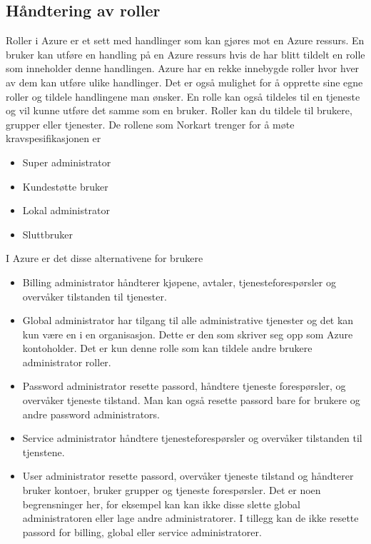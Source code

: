 \subsection{Håndtering av roller}
\label{subsec::konfigurasjon_handteringAvRollerOgGrupper_roller}
Roller i Azure er et sett med handlinger som kan gjøres mot en Azure ressurs. En bruker kan utføre en handling på en Azure ressurs hvis de har blitt tildelt en rolle som inneholder denne handlingen. Azure har en rekke innebygde roller hvor hver av dem kan utføre ulike handlinger. Det er også mulighet for å opprette sine egne roller og tildele handlingene man ønsker. En rolle kan også tildeles til en tjeneste og vil kunne utføre det samme som en bruker. Roller kan du tildele til brukere, grupper eller tjenester. De rollene som Norkart trenger for å møte kravspesifikasjonen er \\
\begin{itemize}
\item Super administrator
\item Kundestøtte bruker
\item Lokal administrator
\item Sluttbruker
\end{itemize}
I Azure er det disse alternativene for brukere
\begin{itemize}
\item Billing administrator håndterer kjøpene, avtaler, tjenesteforespørsler  og overvåker tilstanden til tjenester.
\item Global administrator har tilgang til alle administrative tjenester og det kan kun være en i en organisasjon. Dette er den som skriver seg opp som Azure kontoholder. Det er kun denne rolle som kan tildele andre brukere administrator roller.
\item Password administrator resette passord, håndtere tjeneste forespørsler, og overvåker tjeneste tilstand. Man kan også resette passord bare for brukere og andre password administrators.
\item Service administrator håndtere tjenesteforespørsler og overvåker tilstanden til tjenstene.
\item User administrator resette passord, overvåker tjeneste tilstand og håndterer bruker kontoer, bruker grupper og tjeneste forespørsler. Det er noen begrensninger her, for eksempel kan kan ikke disse slette global administratoren eller lage andre administratorer. I tillegg kan de ikke resette passord for billing, global eller service administratorer.
\end{itemize}

